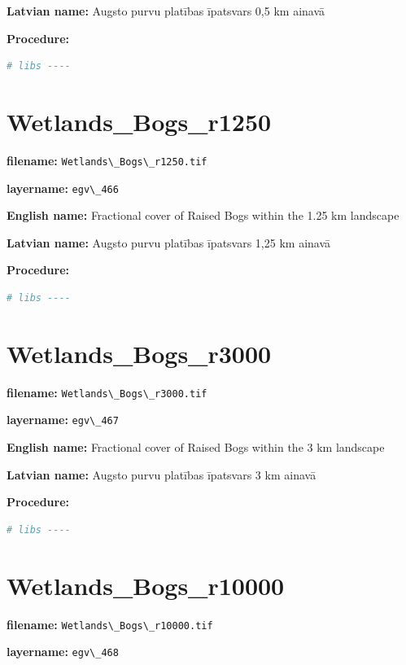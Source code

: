 \documentclass[
]{book}
\newcommand{\passthrough}[1]{#1}
\begin{document}
\textbf{Latvian name:} Augsto purvu platības īpatsvars 0,5 km ainavā

\textbf{Procedure:}

\begin{lstlisting}[language=R]
# libs ----
\end{lstlisting}

\section{Wetlands\_Bogs\_r1250}\label{ch06.466}

\textbf{filename:} \passthrough{\lstinline!Wetlands\_Bogs\_r1250.tif!}

\textbf{layername:} \passthrough{\lstinline!egv\_466!}

\textbf{English name:} Fractional cover of Raised Bogs within the 1.25 km landscape

\textbf{Latvian name:} Augsto purvu platības īpatsvars 1,25 km ainavā

\textbf{Procedure:}

\begin{lstlisting}[language=R]
# libs ----
\end{lstlisting}

\section{Wetlands\_Bogs\_r3000}\label{ch06.467}

\textbf{filename:} \passthrough{\lstinline!Wetlands\_Bogs\_r3000.tif!}

\textbf{layername:} \passthrough{\lstinline!egv\_467!}

\textbf{English name:} Fractional cover of Raised Bogs within the 3 km landscape

\textbf{Latvian name:} Augsto purvu platības īpatsvars 3 km ainavā

\textbf{Procedure:}

\begin{lstlisting}[language=R]
# libs ----
\end{lstlisting}

\section{Wetlands\_Bogs\_r10000}\label{ch06.468}

\textbf{filename:} \passthrough{\lstinline!Wetlands\_Bogs\_r10000.tif!}

\textbf{layername:} \passthrough{\lstinline!egv\_468!}
\end{document}
